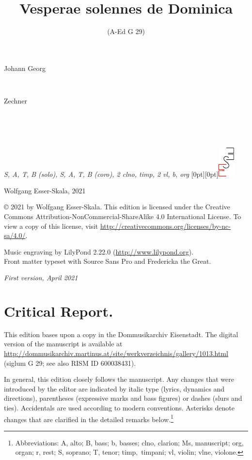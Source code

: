 \documentclass[parskip=full]{scrreprt}
\makeatletter
\DeclareRobustCommand{\sbseries}{\fontseries{sb}\selectfont}
\newcommand\fancytitlehead{
  \headingfont%
  \fontsize{80}{80}\selectfont\textcolor{black!80}{\@ifundefined{@shortname}{\@lastname}{\@shortname}.}\\[15pt]%
  \fontsize{60}{60}\selectfont\@ifundefined{@shorttitle}{\@title}{\@shorttitle}.%
}
\def\firstname#1{\def\@firstname{#1}}
\def\lastname#1{\def\@lastname{#1}}
\def\shorttitle#1{\def\@shorttitle{#1}}
\def\scoring#1{\def\@scoring{#1}}
\def\maketitle{%
\begin{titlepage}%
  \Large%
  {\@titlehead}%
  \vfill%
  {\strut\@firstname}\\%
  {\sbseries\color{oldred}\strut\@lastname}\\%
  {\strut\@namesuffix}%
  \vfill%
  {\sbseries\@title}\\%
  {\@subtitle}\\[\baselineskip]%
  {\itshape\@scoring}%
  \vfill%
  {\itshape\@parts}\hspace*{\fill}\raisebox{0pt}[0pt][0pt]{\includegraphics{ees_logo}}%
\end{titlepage}%
}
\newif\ifprintreport\printreportfalse
\makeatother
\begin{document}
\frenchspacing

\titlehead{\fancytitlehead}
\firstname{Johann Georg}
\lastname{Zechner}
\title{Vesperae solennes de Dominica}
\shorttitle{Vesperae}
\subtitle{(A-Ed G 29)}
\scoring{S, A, T, B (solo), S, A, T, B (coro), 2 clno, timp, 2 vl, b, org}
\maketitle


\thispagestyle{empty}

\vspace*{\fill}

\hspace*{1em}Wolfgang Esser-Skala, 2021

© 2021 by Wolfgang Esser-Skala. This edition is licensed under the Creative Commons Attribution-NonCommercial-ShareAlike 4.0 International License. To view a copy of this license, visit \url{http://creativecommons.org/licenses/by-nc-sa/4.0/}.

Music engraving by LilyPond 2.22.0 (\url{http://www.lilypond.org}).\\
Front matter typeset with Source Sans Pro and Fredericka the Great.

\textit{First version, April 2021}

\vspace*{2cm}

\ifprintreport
\chapter*{Critical Report.}

This edition bases upon a copy in the Dommusikarchiv Eisenstadt. The digital version of the manuscript is available at \url{http://dommusikarchiv.martinus.at/site/werkverzeichnis/gallery/1013.html} (siglum G 29; see also RISM ID 600038431).

In general, this edition closely follows the manuscript. Any changes that were introduced by the editor are indicated by italic type (lyrics, dynamics and directions), parentheses (expressive marks and bass figures) or dashes (slurs and ties). Accidentals are used according to modern conventions. Asterisks denote changes that are clarified in the detailed remarks below.\footnote{Abbreviations: A, alto; B, bass; b, basses; clno, clarion; Ms, manuscript; org, organ; r, rest; S, soprano; T, tenor; timp,~timpani; vl, violin; vlne, violone.}
\end{document}
